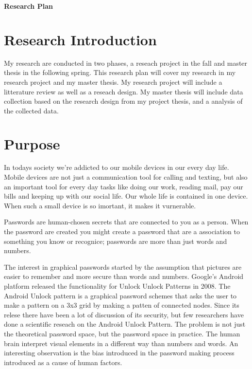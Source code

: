 
{\bf \Huge Research Plan} \\[0.5cm]

  \section*{Research Introduction}

  My research are conducted in two phases, a reseach project in the fall and master thesis in the following spring. This research plan will cover my research in my research project and my master thesis. My research project will include a litterature review as well as a reseach design. My master thesis will include data collection based on the research design from my project thesis, and a analysis of the collected data. 

  \section*{Purpose}


  In todays society we're addicted to our mobile devices in our every day life. Mobile devices are not just a communication tool for calling and texting, but also an important tool for every day tasks like doing our work, reading mail, pay our bills and keeping up with our social life. Our whole life is contained in one device. When such a small device is so imortant, it makes it vurnerable.

  Passwords are human-chosen secrets that are connected to you as a person. When the password are created you might create a password that are a association to something you know or recognice; passwords are more than just words and numbers. 

  The interest in graphical passwords started by the assumption that pictures are easier to remember and more secure than words and numbers. Google's Android platform released the  functionality for Unlock Unlock Patterns in 2008. The Android Unlock pattern is a graphical password schemes that asks the user to make a pattern on a 3x3 grid by making a patten of connected nodes. Since its relese there have been a lot of discussion of its security, but few researchers have done a scientific reseach on the Android Unlock Pattern. The problem is not just the theoretical password space, but the password space in practice. The human brain interpret visual elements in a different way than numbers and words. An interesting observation is the bias introduced in the password making process introduced as a cause of human factors.

